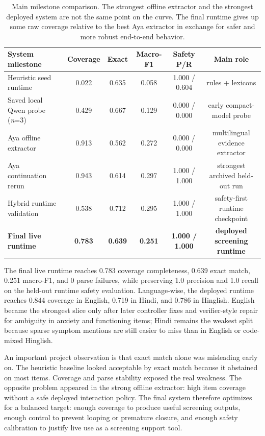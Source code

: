 \documentclass[11pt]{article}
\begin{document}
\begin{table}[t]
\centering
\small
\setlength{\tabcolsep}{5pt}
\begin{tabular}{lccccc}
\toprule
System milestone & Coverage & Exact & Macro-F1 & Safety P/R & Main role \\
\midrule
Heuristic seed runtime & 0.022 & 0.635 & 0.058 & 1.000 / 0.604 & rules + lexicons \\
Saved local Qwen probe (\textit{n}=3) & 0.429 & 0.667 & 0.129 & 0.000 / 0.000 & early compact-model probe \\
Aya offline extractor & 0.913 & 0.562 & 0.272 & 0.000 / 0.000 & multilingual evidence extractor \\
Aya continuation rerun & 0.943 & 0.614 & 0.297 & 1.000 / 1.000 & strongest archived held-out run \\
Hybrid runtime validation & 0.538 & 0.712 & 0.295 & 1.000 / 1.000 & safety-first runtime checkpoint \\
\textbf{Final live runtime} & \textbf{0.783} & \textbf{0.639} & \textbf{0.251} & \textbf{1.000 / 1.000} & \textbf{deployed screening runtime} \\
\bottomrule
\end{tabular}
\caption{Main milestone comparison. The strongest offline extractor and the strongest deployed system are not the same point on the curve. The final runtime gives up some raw coverage relative to the best Aya extractor in exchange for safer and more robust end-to-end behavior.}
\label{tab:results}
\end{table}

The final live runtime reaches 0.783 coverage completeness, 0.639 exact match, 0.251 macro-F1, and 0 parse failures, while preserving 1.0 precision and 1.0 recall on the held-out runtime safety evaluation. Language-wise, the deployed runtime reaches 0.844 coverage in English, 0.719 in Hindi, and 0.786 in Hinglish. English became the strongest slice only after later controller fixes and verifier-style repair for ambiguity in anxiety and functioning items; Hindi remains the weakest split because sparse symptom mentions are still easier to miss than in English or code-mixed Hinglish.

An important project observation is that exact match alone was misleading early on. The heuristic baseline looked acceptable by exact match because it abstained on most items. Coverage and parse stability exposed the real weakness. The opposite problem appeared in the strong offline extractor: high item coverage without a safe deployed interaction policy. The final system therefore optimizes for a balanced target: enough coverage to produce useful screening outputs, enough control to prevent looping or premature closure, and enough safety calibration to justify live use as a screening support tool.
\end{document}
